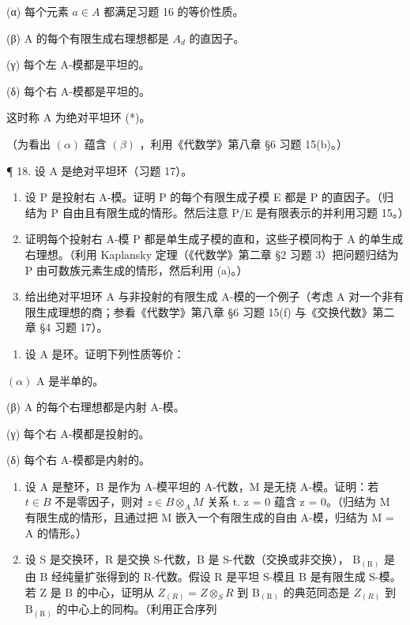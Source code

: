 (α) 每个元素 \(a \in A\) 都满足习题 16 的等价性质。

(β) A 的每个有限生成右理想都是 \(A_{d}\) 的直因子。

(γ) 每个左 A-模都是平坦的。

(δ) 每个右 A-模都是平坦的。

这时称 A 为绝对平坦环 (*)。

（为看出 \((\alpha)\) 蕴含 \((\beta)\) ，利用《代数学》第八章 §6 习题 15(b)。）

¶ 18. 设 A 是绝对平坦环（习题 17）。

\begin{enumerate}
\def\labelenumi{(\alph{enumi})}
\item
  设 P 是投射右 A-模。证明 P 的每个有限生成子模 E 都是 P 的直因子。（归结为 P 自由且有限生成的情形。然后注意 P/E 是有限表示的并利用习题 15。）
\item
  证明每个投射右 A-模 P 都是单生成子模的直和，这些子模同构于 A 的单生成右理想。（利用 Kaplansky 定理（《代数学》第二章 §2 习题 3）把问题归结为 P 由可数族元素生成的情形，然后利用 (a)。）
\item
给出绝对平坦环 A 与非投射的有限生成 A-模的一个例子（考虑 A 对一个非有限生成理想的商；参看《代数学》第八章 §6 习题 15(f) 与《交换代数》第二章 §4 习题 17）。
\end{enumerate}

\begin{enumerate}
\def\labelenumi{\arabic{enumi}.}
\setcounter{enumi}{18}
\tightlist
\item
  设 A 是环。证明下列性质等价：
\end{enumerate}

\((\alpha)\) A 是半单的。

(β) A 的每个右理想都是内射 A-模。

(γ) 每个右 A-模都是投射的。

(δ) 每个右 A-模都是内射的。

\begin{enumerate}
\def\labelenumi{\arabic{enumi}.}
\setcounter{enumi}{19}
\item
  设 A 是整环，B 是作为 A-模平坦的 A-代数，M 是无挠 A-模。证明：若 \(t \in B\) 不是零因子，则对 \(z \in B \otimes_{A} M\) 关系 t. z = 0 蕴含 z = 0。（归结为 M 有限生成的情形，且通过把 M 嵌入一个有限生成的自由 A-模，归结为 M = A 的情形。）
\item
  设 S 是交换环，R 是交换 S-代数，B 是 S-代数（交换或非交换）， \(\mathrm{B}_{(\mathrm{R})}\) 是由 B 经纯量扩张得到的 R-代数。假设 R 是平坦 S-模且 B 是有限生成 S-模。若 Z 是 B 的中心，证明从 \(Z_{(R)} = Z \otimes_{S} R\) 到 \(\mathrm{B}_{(\mathrm{R})}\) 的典范同态是 \(Z_{(R)}\) 到 \(\mathrm{B}_{(\mathrm{R})}\) 的中心上的同构。（利用正合序列
\end{enumerate}

